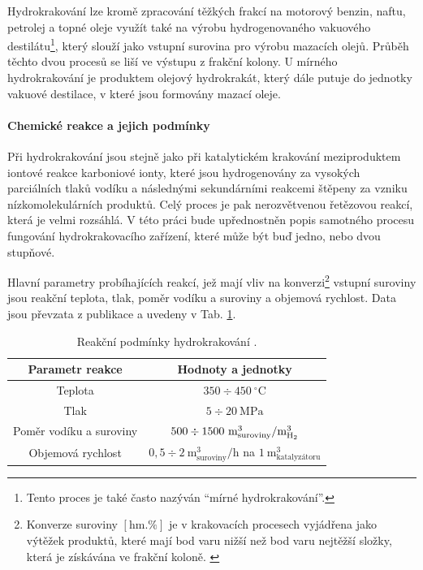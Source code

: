 Hydrokrakování lze kromě zpracování těžkých frakcí na motorový benzin, naftu, petrolej a topné oleje využít také na výrobu hydrogenovaného vakuového destilátu\footnote{Tento proces je také často nazýván \enquote{mírné hydrokrakování}.}, který slouží jako vstupní surovina pro výrobu mazacích olejů. Průběh těchto dvou procesů se liší ve výstupu z frakční kolony. U mírného hydrokrakování je produktem olejový hydrokrakát, který dále putuje do jednotky vakuové destilace, v které jsou formovány mazací oleje. \cite{Blazek2006}

\paragraph{Chemické reakce a jejich podmínky}
Při hydrokrakování jsou stejně jako při katalytickém krakování meziproduktem iontové reakce karboniové ionty, které jsou hydrogenovány za vysokých parciálních tlaků vodíku a následnými sekundárními reakcemi štěpeny za vzniku nízkomolekulárních produktů. Celý proces je pak nerozvětvenou řetězovou reakcí, která je velmi rozsáhlá. \cite{Speight2020} V této práci bude upřednostněn popis samotného procesu fungování hydrokrakovacího zařízení, které může být buď jedno, nebo dvou stupňové.

Hlavní parametry probíhajících reakcí, jež mají vliv na konverzi\footnote{Konverze suroviny $[\mathrm{hm.}\%]$ je v krakovacích procesech vyjádřena jako výtěžek produktů, které mají bod varu nižší než bod varu nejtěžší složky, která je získávána ve frakční koloně. \cite{Blazek2006}} vstupní suroviny jsou reakční teplota, tlak, poměr vodíku a suroviny a objemová rychlost. Data jsou převzata z publikace \cite{Blazek2006} a uvedeny v Tab. \ref{tab:rp_hydrokrakovani}.
\begin{table}[h]
    \centering
    \begin{tabular}{|c|c|}
        \hline
        \textbf{Parametr reakce} & \textbf{Hodnoty a jednotky} \\ \hline\hline
        Teplota & $350\div450\ \mathrm{^{\circ}C}$ \\ \hline
        Tlak & $5 \div 20\ \mathrm{MPa}$ \\ \hline
        Poměr vodíku a suroviny & $500 \div 1500\ \mathrm{m^3_{suroviny}/m^3_{\ce{H2}}}$ \\ \hline
        Objemová rychlost & $0,5 \div 2\ \mathrm{m^3_{suroviny}/h}$ na $1\ \mathrm{m^3_{\text{katalyzátoru}}}$ \\ \hline
    \end{tabular}
    \caption[Reakční podmínky hydrokrakování]{Reakční podmínky hydrokrakování \cite{Blazek2006}.}
    \label{tab:rp_hydrokrakovani}
\end{table}

